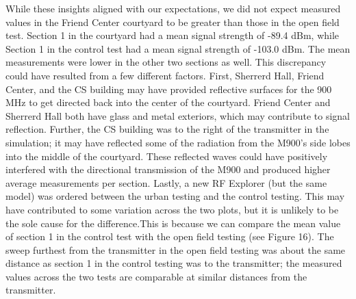 \documentclass[pageno]{jpaper}
\begin{document}
While these insights aligned with our expectations, we did not expect measured values in the Friend Center courtyard to be greater than those in the open field test. Section 1 in the courtyard had a mean signal strength of -89.4 dBm, while Section 1 in the control test had a mean signal strength of -103.0 dBm. The mean measurements were lower in the other two sections as well. This discrepancy could have resulted from a few different factors. First, Sherrerd Hall, Friend Center, and the CS building may have provided reflective surfaces for the 900 MHz to get directed back into the center of the courtyard. Friend Center and Sherrerd Hall both have glass and metal exteriors, which may contribute to signal reflection. Further, the CS building was to the right of the transmitter in the simulation; it may have reflected some of the radiation from the M900's side lobes into the middle of the courtyard. These reflected waves could have positively interfered with the directional transmission of the M900 and produced higher average measurements per section. Lastly, a new RF Explorer (but the same model) was ordered between the urban testing and the control testing. This may have contributed to some variation across the two plots, but it is unlikely to be the sole cause for the difference.This is because we can compare the mean value of section 1 in the control test with the open field testing (see Figure 16). The sweep furthest from the transmitter in the open field testing was about the same distance as section 1 in the control testing was to the transmitter; the measured values across the two tests are comparable at similar distances from the transmitter.
\end{document}

